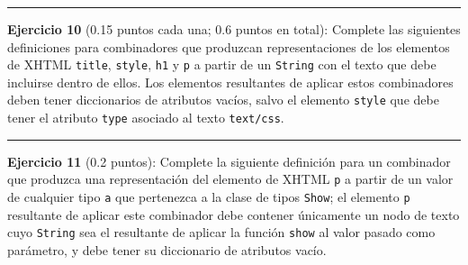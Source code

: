 \begin{center}\rule{3in}{0.4pt}\end{center}

\textbf{Ejercicio 10} (0.15 puntos cada una; 0.6 puntos en total):
Complete las siguientes definiciones para combinadores que produzcan
representaciones de los elementos de XHTML \texttt{title},
\texttt{style}, \texttt{h1} y \texttt{p} a partir de un \texttt{String}
con el texto que debe incluirse dentro de ellos. Los elementos
resultantes de aplicar estos combinadores deben tener diccionarios de
atributos vacíos, salvo el elemento \texttt{style} que debe tener el
atributo \texttt{type} asociado al texto \texttt{text/css}.

\begin{Shaded}
\begin{Highlighting}[]
  \OtherTok{->} 
\FunctionTok{=}    \NormalTok{) [} \NormalTok{s]}
\FunctionTok{=}   \NormalTok{empty [} \NormalTok{s]}
\FunctionTok{=}      \NormalTok{empty [} \NormalTok{s]}
\FunctionTok{=}       \NormalTok{empty [} \NormalTok{s]}
\end{Highlighting}
\end{Shaded}

\begin{center}\rule{3in}{0.4pt}\end{center}

\textbf{Ejercicio 11} (0.2 puntos): Complete la siguiente definición
para un combinador que produzca una representación del elemento de XHTML
\texttt{p} a partir de un valor de cualquier tipo \texttt{a} que
pertenezca a la clase de tipos \texttt{Show}; el elemento \texttt{p}
resultante de aplicar este combinador debe contener únicamente un nodo
de texto cuyo \texttt{String} sea el resultante de aplicar la función
\texttt{show} al valor pasado como parámetro, y debe tener su
diccionario de atributos vacío.

\begin{Shaded}
\begin{Highlighting}[]
  \OtherTok{=>} \OtherTok{->} 
\FunctionTok{=}  
\end{Highlighting}
\end{Shaded}

